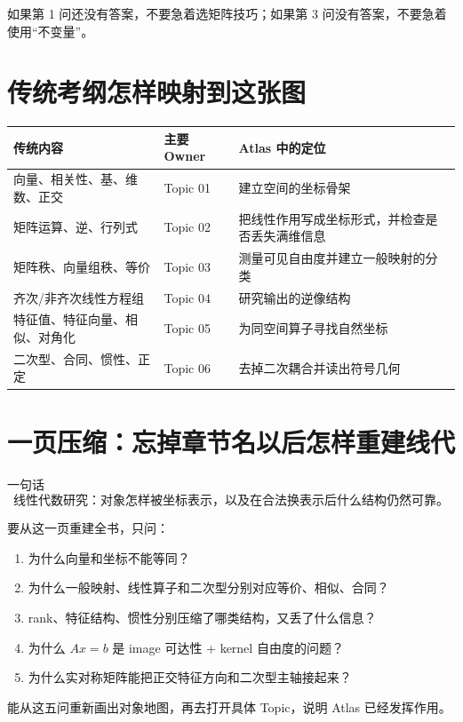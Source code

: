 \documentclass[11pt,a4paper]{ctexart}
\begin{document}
如果第 1 问还没有答案，不要急着选矩阵技巧；如果第 3 问没有答案，不要急着使用“不变量”。

\section{传统考纲怎样映射到这张图}

\begin{longtable}{L{3.7cm}L{5.2cm}L{6.9cm}}
\toprule
\textbf{传统内容} & \textbf{主要 Owner} & \textbf{Atlas 中的定位}\\
\midrule
向量、相关性、基、维数、正交 & Topic 01 & 建立空间的坐标骨架\\
矩阵运算、逆、行列式 & Topic 02 & 把线性作用写成坐标形式，并检查是否丢失满维信息\\
矩阵秩、向量组秩、等价 & Topic 03 & 测量可见自由度并建立一般映射的分类\\
齐次/非齐次线性方程组 & Topic 04 & 研究输出的逆像结构\\
特征值、特征向量、相似、对角化 & Topic 05 & 为同空间算子寻找自然坐标\\
二次型、合同、惯性、正定 & Topic 06 & 去掉二次耦合并读出符号几何\\
\bottomrule
\end{longtable}

\section{一页压缩：忘掉章节名以后怎样重建线代}

\begin{corebox}{一句话}
\[
\boxed{\text{线性代数研究：对象怎样被坐标表示，以及在合法换表示后什么结构仍然可靠。}}
\]
\end{corebox}

\begin{center}
\end{center}

要从这一页重建全书，只问：

\begin{enumerate}
  \item 为什么向量和坐标不能等同？
  \item 为什么一般映射、线性算子和二次型分别对应等价、相似、合同？
  \item rank、特征结构、惯性分别压缩了哪类结构，又丢了什么信息？
  \item 为什么 $Ax=b$ 是 image 可达性 + kernel 自由度的问题？
  \item 为什么实对称矩阵能把正交特征方向和二次型主轴接起来？
\end{enumerate}

能从这五问重新画出对象地图，再去打开具体 Topic，说明 Atlas 已经发挥作用。
\end{document}
